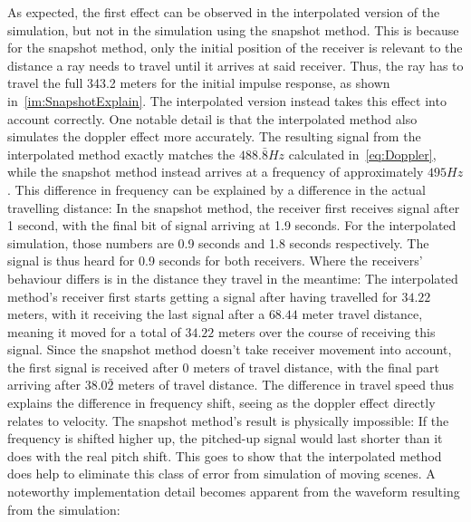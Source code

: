 As expected, the first effect can be observed in the interpolated version of the simulation,
but not in the simulation using the snapshot method.
This is because for the snapshot method,
only the initial position of the receiver is relevant to the distance a ray needs to travel until it arrives at said receiver.
Thus, the ray has to travel the full 343.2 meters for the initial impulse response, as shown in~\autoref{im:SnapshotExplain}.
The interpolated version instead takes this effect into account correctly.
\newline
One notable detail is that the interpolated method also simulates the doppler effect more accurately.
The resulting signal from the interpolated method exactly matches the \(488.\bar{8} Hz\) calculated in~\eqref{eq:Doppler},
while the snapshot method instead arrives at a frequency of approximately \(495 Hz\).
\newline
This difference in frequency can be explained by a difference in the actual travelling distance:
In the snapshot method, the receiver first receives signal after 1 second,
with the final bit of signal arriving at 1.9 seconds.
For the interpolated simulation, those numbers are 0.9 seconds and 1.8 seconds respectively.
The signal is thus heard for 0.9 seconds for both receivers.
\newline
Where the receivers' behaviour differs is in the distance they travel in the meantime:
The interpolated method's receiver first starts getting a signal after having travelled for \(34.22\) meters,
with it receiving the last signal after a \(68.44\) meter travel distance,
meaning it moved for a total of \(34.22\) meters over the course of receiving this signal.
Since the snapshot method doesn't take receiver movement into account,
the first signal is received after 0 meters of travel distance,
with the final part arriving after \(38.0\bar{2}\) meters of travel distance.
\newline
The difference in travel speed thus explains the difference in frequency shift,
seeing as the doppler effect directly relates to velocity.
The snapshot method's result is physically impossible:
If the frequency is shifted higher up,
the pitched-up signal would last shorter than it does with the real pitch shift.
\newline
This goes to show that the interpolated method does help to eliminate this class of error from simulation of moving scenes.
\newline
A noteworthy implementation detail becomes apparent from the waveform resulting from the simulation:
